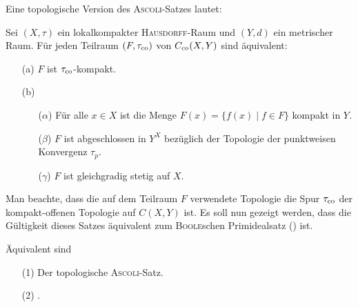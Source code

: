 Eine topologische Version des \textsc{Ascoli}-Satzes lautet:
\begin{defn}
  Sei $(X,\tau)$ ein lokalkompakter \textsc{Hausdorff}-Raum und $(Y,d)$ ein metrischer Raum.
  Für jeden Teilraum $(F,\tau_{\mathrm{co}})$ von $C_{\mathrm{co}}(X,Y)$ sind äquivalent:
  \begin{enumerate}
    \item[(a)] $F$ ist $\tau_{\mathrm{co}}$-kompakt.
    \item[(b)] \begin{enumerate}
        \item[($\alpha$)] Für alle $x \in X$ ist die Menge $F(x) = \{f(x) \mid f \in F \}$ kompakt in $Y$.
        \item[($\beta$)]  $F$ ist abgeschlossen in $Y^X$ bezüglich der Topologie der punktweisen Konvergenz $\tau_p$.
        \item[($\gamma$)] $F$ ist gleichgradig stetig auf $X$.
      \end{enumerate}
  \end{enumerate}
\end{defn}

Man beachte, dass die auf dem Teilraum $F$ verwendete Topologie die Spur $\tau_{\mathrm{co}}$ der kompakt-offenen Topologie auf $C(X,Y)$ ist.
Es soll nun gezeigt werden, dass die Gültigkeit dieses Satzes äquivalent zum \textsc{Boole}schen Primidealsatz (\PIT) ist.

\begin{thm}
  \label{thm:ascoliPIT}
  Äquivalent sind
  \begin{enumerate}
    \item[(1)] Der topologische \textsc{Ascoli}-Satz.
    \item[(2)] \PIT.
  \end{enumerate}
\end{thm}

